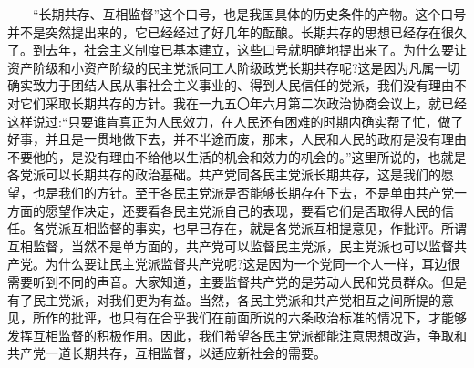 \documentclass[cn,11pt,chinese]{elegantbook}
\begin{document}
　　“长期共存、互相监督”这个口号，也是我国具体的历史条件的产物。这个口号并不是突然提出来的，它已经经过了好几年的酝酿。长期共存的思想已经存在很久了。到去年，社会主义制度已基本建立，这些口号就明确地提出来了。为什么要让资产阶级和小资产阶级的民主党派同工人阶级政党长期共存呢?这是因为凡属一切确实致力于团结人民从事社会主义事业的、得到人民信任的党派，我们没有理由不对它们采取长期共存的方针。我在一九五〇年六月第二次政治协商会议上，就已经这样说过:“只要谁肯真正为人民效力，在人民还有困难的时期内确实帮了忙，做了好事，并且是一贯地做下去，并不半途而废，那末，人民和人民的政府是没有理由不要他的，是没有理由不给他以生活的机会和效力的机会的。”这里所说的，也就是各党派可以长期共存的政治基础。共产党同各民主党派长期共存，这是我们的愿望，也是我们的方针。至于各民主党派是否能够长期存在下去，不是单由共产党一方面的愿望作决定，还要看各民主党派自己的表现，要看它们是否取得人民的信任。各党派互相监督的事实，也早已存在，就是各党派互相提意见，作批评。所谓互相监督，当然不是单方面的，共产党可以监督民主党派，民主党派也可以监督共产党。为什么要让民主党派监督共产党呢?这是因为一个党同一个人一样，耳边很需要听到不同的声音。大家知道，主要监督共产党的是劳动人民和党员群众。但是有了民主党派，对我们更为有益。当然，各民主党派和共产党相互之间所提的意见，所作的批评，也只有在合乎我们在前面所说的六条政治标准的情况下，才能够发挥互相监督的积极作用。因此，我们希望各民主党派都能注意思想改造，争取和共产党一道长期共存，互相监督，以适应新社会的需要。\\
\end{document}
